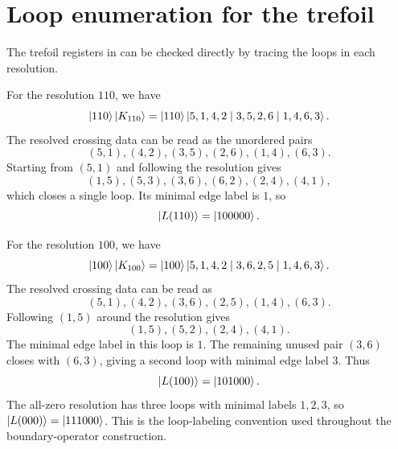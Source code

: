\documentclass[a4paper,onecolumn,unpublished]{quantumarticle}
\theoremstyle{plain}
\theoremstyle{definition}
\theoremstyle{definition}
\numberwithin{equation}{section}
\begin{document}
\section{Loop enumeration for the trefoil}\label{app:encoding_example}

The trefoil registers in  can be checked directly by tracing the loops in each resolution.

For the resolution \(110\), we have
\[
\ket{110}\ket{K_{110}}
=
\ket{110}\ket{5,1,4,2\mid 3,5,2,6\mid 1,4,6,3}.
\]
The resolved crossing data can be read as the unordered pairs
\[
(5,1), (4,2), (3,5), (2,6), (1,4), (6,3).
\]
Starting from \((5,1)\) and following the resolution gives
\[
(1,5), (5,3), (3,6), (6,2), (2,4), (4,1),
\]
which closes a single loop.  Its minimal edge label is \(1\), so
\[
\ket{L(110)}=\ket{100000}.
\]

For the resolution \(100\), we have
\[
\ket{100}\ket{K_{100}}
=\ket{100}\ket{5,1,4,2\mid 3,6,2,5\mid 1,4,6,3}.
\]
The resolved crossing data can be read as
\[
(5,1), (4,2), (3,6), (2,5), (1,4), (6,3).
\]
Following \((1,5)\) around the resolution gives
\[
(1,5), (5,2), (2,4), (4,1).
\]
The minimal edge label in this loop is \(1\).  The remaining unused pair \((3,6)\) closes with \((6,3)\), giving a second loop with minimal edge label \(3\).  Thus
\[
\ket{L(100)}=\ket{101000}.
\]
The all-zero resolution has three loops with minimal labels \(1,2,3\), so \(\ket{L(000)}=\ket{111000}\).  This is the loop-labeling convention used throughout the boundary-operator construction.



\end{document}
